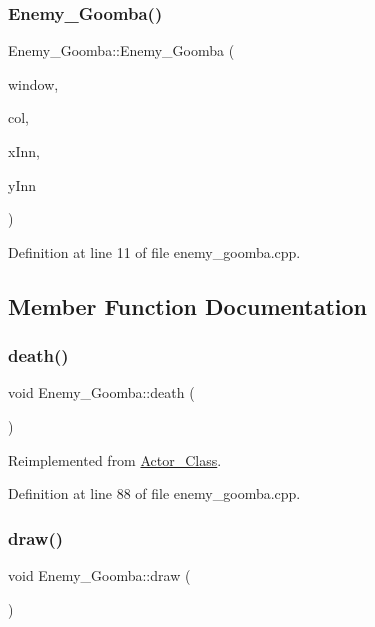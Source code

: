 \subsubsection{\texorpdfstring{Enemy\+\_\+\+Goomba()}{Enemy\_Goomba()}}
{\footnotesize\ttfamily Enemy\+\_\+\+Goomba\+::\+Enemy\+\_\+\+Goomba (\begin{DoxyParamCaption}\item[{sf\+::\+Render\+Window \&}]{window,  }\item[{\hyperlink{class_collision}{Collision}}]{col,  }\item[{int}]{x\+Inn,  }\item[{int}]{y\+Inn }\end{DoxyParamCaption})}



Definition at line 11 of file enemy\+\_\+goomba.\+cpp.



\subsection{Member Function Documentation}
\hypertarget{class_enemy___goomba_a09cd52bddf5aa44b94d85adeefa46620}{}\label{class_enemy___goomba_a09cd52bddf5aa44b94d85adeefa46620} 
\subsubsection{\texorpdfstring{death()}{death()}}
{\footnotesize\ttfamily void Enemy\+\_\+\+Goomba\+::death (\begin{DoxyParamCaption}{ }\end{DoxyParamCaption})\hspace{0.3cm}{\ttfamily [virtual]}}



Reimplemented from \hyperlink{class_actor___class_a9447c6154a674d7e6bdf24ff2874b7a8}{Actor\+\_\+\+Class}.



Definition at line 88 of file enemy\+\_\+goomba.\+cpp.

\hypertarget{class_enemy___goomba_a1947885e29f42889e42947462a9caeb3}{}\label{class_enemy___goomba_a1947885e29f42889e42947462a9caeb3} 
\subsubsection{\texorpdfstring{draw()}{draw()}}
{\footnotesize\ttfamily void Enemy\+\_\+\+Goomba\+::draw (\begin{DoxyParamCaption}{ }\end{DoxyParamCaption})\hspace{0.3cm}{\ttfamily [virtual]}}



